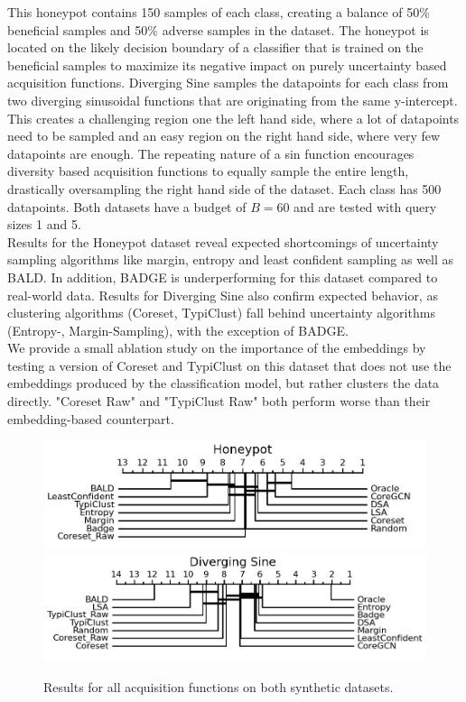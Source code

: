 \documentclass[]{article}
\begin{document}
This honeypot contains 150 samples of each class, creating a balance of 50\% beneficial samples and 50\% adverse samples in the dataset.
The honeypot is located on the likely decision boundary of a classifier that is trained on the beneficial samples to maximize its negative impact on purely uncertainty based acquisition functions.
Diverging Sine samples the datapoints for each class from two diverging sinusoidal functions that are originating from the same y-intercept.
This creates a challenging region one the left hand side, where a lot of datapoints need to be sampled and an easy region on the right hand side, where very few datapoints are enough. 
The repeating nature of a sin function encourages diversity based acquisition functions to equally sample the entire length, drastically oversampling the right hand side of the dataset.
Each class has 500 datapoints. 
Both datasets have a budget of $B=60$ and are tested with query sizes 1 and 5.\\
%
Results for the Honeypot dataset reveal expected shortcomings of uncertainty sampling algorithms like margin, entropy and least confident sampling as well as BALD.
In addition, BADGE is underperforming for this dataset compared to real-world data. 
Results for Diverging Sine also confirm expected behavior, as clustering algorithms (Coreset, TypiClust) fall behind uncertainty algorithms (Entropy-, Margin-Sampling), with the exception of BADGE. \\
We provide a small ablation study on the importance of the embeddings by testing a version of Coreset and TypiClust on this dataset that does not use the embeddings produced by the classification model, but rather clusters the data directly.
"Coreset Raw" and "TypiClust Raw" both perform worse than their embedding-based counterpart.
\begin{figure}
	\centering
	\caption{Results for all acquisition functions on both synthetic datasets.}
	\label{fig:main_body_result}
	\includegraphics[width=0.49\linewidth]{img/micro_honeypot.jpg}
	\includegraphics[width=0.49\linewidth]{img/micro_diverging_sin.jpg}
\end{figure}
\end{document}
